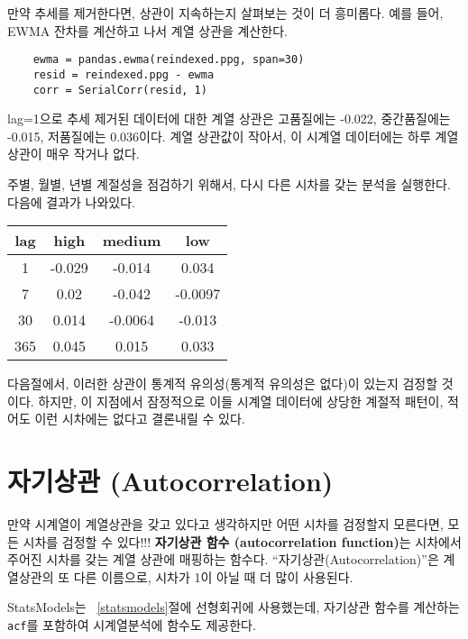 만약 추세를 제거한다면, 상관이 지속하는지 살펴보는 것이 더 흥미롭다.
예를 들어, EWMA 잔차를 계산하고 나서 계열 상관을 계산한다.

\begin{verbatim}
    ewma = pandas.ewma(reindexed.ppg, span=30)
    resid = reindexed.ppg - ewma
    corr = SerialCorr(resid, 1)
\end{verbatim}

lag=1으로 추세 제거된 데이터에 대한 계열 상관은 고품질에는 -0.022,
중간품질에는 -0.015, 저품질에는 0.036이다.
계열 상관값이 작아서, 이 시계열 데이터에는 하루 계열상관이 매우 작거나 없다.

주별, 월별, 년별 계절성을 점검하기 위해서, 다시 다른 시차를 갖는 분석을 실행한다. 다음에 결과가 나와있다. 

\begin{center}
\begin{tabular}{|c|c|c|c|}
\hline
lag & high & medium & low \\ \hline
1 & -0.029 & -0.014 & 0.034 \\
7 & 0.02 & -0.042 & -0.0097 \\
30 & 0.014 & -0.0064 & -0.013 \\
365 & 0.045 & 0.015 & 0.033 \\
\hline
\end{tabular}
\end{center}

다음절에서, 이러한 상관이 통계적 유의성(통계적 유의성은 없다)이 있는지 검정할 것이다. 하지만, 이 지점에서 잠정적으로 이들 시계열 데이터에 상당한 계절적 패턴이, 적어도 이런 시차에는 없다고 결론내릴 수 있다.



\section{자기상관 (Autocorrelation)}

만약 시계열이 계열상관을 갖고 있다고 생각하지만 어떤 시차를 검정할지 모른다면, 모든 시차를 검정할 수 있다!!! {\bf 자기상관 함수 (autocorrelation function)}는 시차에서 주어진 시차를 갖는 계열 상관에 매핑하는 함수다. ``자기상관(Autocorrelation)''은 계열상관의 또 다른 이름으로, 시차가 1이 아닐 때 더 많이 사용된다.

StatsModels는 ~\ref{statsmodels}절에 선형회귀에 사용했는데, 자기상관 함수를 계산하는 {\tt acf}를 포함하여 시계열분석에 함수도 제공한다.

